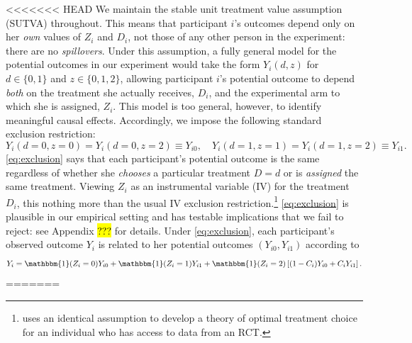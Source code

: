 \documentclass[oneside,11pt]{article}
\begin{document}
<<<<<<< HEAD
We maintain the stable unit treatment value assumption (SUTVA) throughout. 
This means that participant $i$'s outcomes depend only on her \emph{own} values of $Z_i$ and $D_i$, not those of any other person in the experiment: there are no \emph{spillovers}. 
Under this assumption, a fully general model for the potential outcomes in our experiment would take the form $Y_i(d, z)$ for $d\in \{0,1\}$ and $z \in \{0, 1, 2\}$, allowing participant $i$'s potential outcome to depend \emph{both} on the treatment she actually receives, $D_i$, and the experimental arm to which she is assigned, $Z_i$. 
This model is too general, however, to identify meaningful causal effects. 
Accordingly, we impose the following standard exclusion restriction:
\begin{equation}
Y_i(d=0, z=0) = Y_i(d=0, z=2) \equiv Y_{i0}, \quad
Y_i(d=1, z=1) = Y_i(d=1, z=2) \equiv Y_{i1}.
\label{eq:exclusion}
\end{equation}
\eqref{eq:exclusion} says that each participant's potential outcome is the same regardless of whether she \emph{chooses} a particular treatment $D=d$ or is \emph{assigned} the same treatment. Viewing $Z_i$ as an instrumental variable (IV) for the treatment $D_i$, this nothing more than the usual IV exclusion restriction.\footnote{\cite{chamberlain2011bayesian} uses an identical assumption to develop a theory of optimal treatment choice for an individual who has access to data from an RCT.} \eqref{eq:exclusion} is plausible in our empirical setting and has testable implications that we fail to reject: see Appendix \hl{???} for details. Under \eqref{eq:exclusion}, each participant's observed outcome $Y_i$ is related to her potential outcomes $(Y_{i0}, Y_{i1})$ according to 
\begin{equation}
    Y_i = \mathbbm{1}(Z_i =0) Y_{i0} + \mathbbm{1}(Z_i = 1)  Y_{i1}  + \mathbbm{1}(Z_i = 2) \left[(1 - C_i) Y_{i0} + C_i Y_{i1} \right].
\label{eq:potentialOutcomes}
\end{equation}
=======
\end{document}
